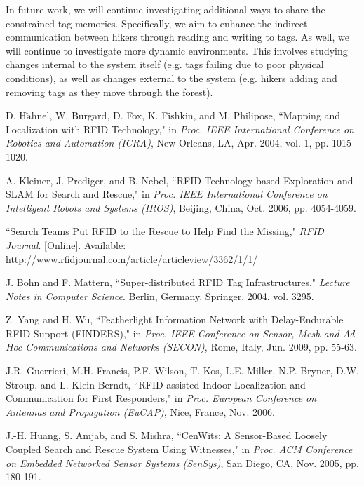 \documentclass[conference]{IEEEtran}
\begin{document}
In future work, we will continue investigating additional ways to share the constrained tag memories.  Specifically, we aim to enhance the indirect communication between hikers through reading and writing to tags.  As well, we will continue to investigate more dynamic environments.  This involves studying changes internal to the system itself (e.g. tags failing due to poor physical conditions), as well as changes external to the system (e.g. hikers adding and removing tags as they move through the forest). 

%
%

\begin{thebibliography}{1}
D. H$\ddot{\mbox{a}}$hnel, W. Burgard, D. Fox, K. Fishkin, and M. Philipose, ``Mapping and Localization with RFID Technology,"   in \emph{Proc. IEEE International Conference on Robotics and Automation (ICRA)}, New Orleans, LA, Apr. 2004, vol. 1, pp. 1015-1020.

A. Kleiner, J. Prediger, and B. Nebel, ``RFID Technology-based Exploration and SLAM for Search and Rescue," in \emph{Proc. IEEE International Conference on Intelligent Robots and Systems (IROS)}, Beijing, China, Oct. 2006, pp. 4054-4059.

``Search Teams Put RFID to the Rescue to Help Find the Missing," \emph{RFID Journal}. [Online]. Available: http://www.rfidjournal.com/article/articleview/3362/1/1/

J. Bohn and F. Mattern, ``Super-distributed RFID Tag Infrastructures," \emph{Lecture Notes in Computer Science}.  Berlin, Germany. Springer, 2004. vol. 3295.

Z. Yang and H. Wu, ``Featherlight Information Network with Delay-Endurable RFID Support (FINDERS)," in \emph{Proc. IEEE Conference on Sensor, Mesh and Ad Hoc Communications and Networks (SECON)}, Rome, Italy, Jun. 2009, pp. 55-63.

J.R. Guerrieri, M.H. Francis, P.F. Wilson, T. Kos, L.E. Miller, N.P. Bryner, D.W. Stroup, and L. Klein-Berndt, ``RFID-assisted Indoor Localization and Communication for First Responders," in \emph{Proc. European Conference on Antennas and Propagation (EuCAP)}, Nice, France, Nov. 2006.

J.-H. Huang, S. Amjab, and S. Mishra, ``CenWits: A Sensor-Based Loosely Coupled Search and Rescue System Using Witnesses," in \emph{Proc. ACM Conference on Embedded Networked Sensor Systems (SenSys)}, San Diego, CA, Nov. 2005, pp. 180-191.


\end{thebibliography}
\end{document}
